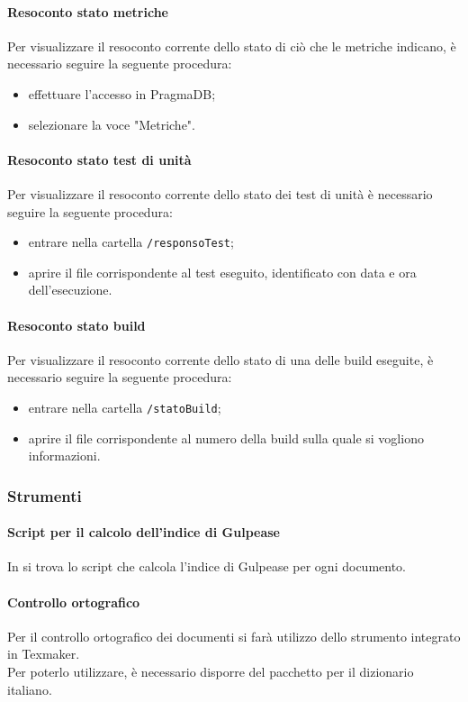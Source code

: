 \paragraph{Resoconto stato metriche}
Per visualizzare il resoconto corrente dello stato di ciò che le metriche indicano, è necessario seguire la seguente procedura:
\begin{itemize}
	\item effettuare l'accesso in PragmaDB;
	\item selezionare la voce "Metriche".
\end{itemize}
\paragraph{Resoconto stato test di unità}
Per visualizzare il resoconto corrente dello stato dei test di unità è necessario seguire la seguente procedura:
\begin{itemize}
	\item entrare nella cartella \texttt{/responsoTest};
	\item aprire il file corrispondente al test eseguito, identificato con data e ora dell'esecuzione.
\end{itemize}
\paragraph{Resoconto stato build}
Per visualizzare il resoconto corrente dello stato di una delle build eseguite, è necessario seguire la seguente procedura:
\begin{itemize}
	\item entrare nella cartella \texttt{/statoBuild};
	\item aprire il file corrispondente al numero della build sulla quale si vogliono informazioni.
\end{itemize}

\subsubsection{Strumenti}
\paragraph{Script per il calcolo dell'indice di Gulpease}
In \GulScript{} si trova lo script che calcola l'indice di Gulpease per ogni documento.
\paragraph{Controllo ortografico}
Per il controllo ortografico dei documenti si farà utilizzo dello strumento integrato in Texmaker.\\
Per poterlo utilizzare, è necessario disporre del pacchetto per il dizionario italiano.
